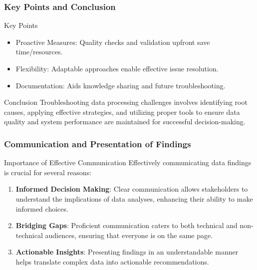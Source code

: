 \documentclass[aspectratio=169]{beamer}
\begin{document}
\begin{frame}
  \frametitle{Key Points and Conclusion}
  \begin{block}{Key Points}
    \begin{itemize}
      \item Proactive Measures: Quality checks and validation upfront save time/resources.
      \item Flexibility: Adaptable approaches enable effective issue resolution.
      \item Documentation: Aids knowledge sharing and future troubleshooting.
    \end{itemize}
  \end{block}

  \begin{block}{Conclusion}
    Troubleshooting data processing challenges involves identifying root causes, applying effective strategies, and utilizing proper tools to ensure data quality and system performance are maintained for successful decision-making.
  \end{block}
\end{frame}

\begin{frame}[fragile]
    \frametitle{Communication and Presentation of Findings}
    \begin{block}{Importance of Effective Communication}
        Effectively communicating data findings is crucial for several reasons:
    \end{block}
    \begin{enumerate}
        \item \textbf{Informed Decision Making}: Clear communication allows stakeholders to understand the implications of data analyses, enhancing their ability to make informed choices.
        \item \textbf{Bridging Gaps}: Proficient communication caters to both technical and non-technical audiences, ensuring that everyone is on the same page.
        \item \textbf{Actionable Insights}: Presenting findings in an understandable manner helps translate complex data into actionable recommendations.
    \end{enumerate}
\end{frame}
\end{document}
